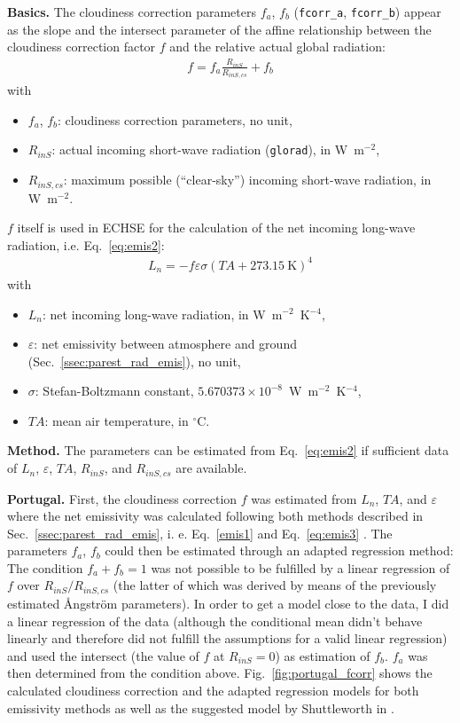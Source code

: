 \documentclass{scrreprt}
\newenvironment{denseitem}{
  \begin{itemize}
    \setlength{\itemsep}{0pt}
    \setlength{\parskip}{0pt}
    \setlength{\parsep}{0pt}
}{
  \end{itemize}
}
\begin{document}
\textbf{Basics.}
The cloudiness correction parameters $f_a$, $f_b$ (\verb!fcorr_a!, \verb!fcorr_b!) appear as the slope and the intersect parameter of the affine relationship between the cloudiness correction factor $f$ and the relative actual global radiation:
\begin{align} \label{eq:fcorr1}
  f = f_a \frac{R_{inS}}{R_{inS,cs}} + f_b
\end{align}
%
with
\begin{denseitem}
  \item[] $f_a$, $f_b$: cloudiness correction parameters, no unit,
  \item[] $R_{inS}$: actual incoming short-wave radiation (\verb!glorad!), in W~m$^{-2}$,
  \item[] $R_{inS,cs}$: maximum possible (``clear-sky'') incoming short-wave radiation, in W~m$^{-2}$.
\end{denseitem}
%
$f$ itself is used in ECHSE for the calculation of the net incoming long-wave radiation, i.e. Eq.~\eqref{eq:emis2}:
\begin{align*}
  L_n = -f \varepsilon \sigma (TA + 273.15~\text{K})^4
\end{align*}
%
with
\begin{denseitem}
  \item[] $L_n$: net incoming long-wave radiation, in W~m$^{-2}$~K$^{-4}$,
  \item[] $\varepsilon$: net emissivity between atmosphere and ground (Sec.~\ref{ssec:parest_rad_emis}), no unit,
  \item[] $\sigma$: Stefan-Boltzmann constant, $5.670373 \times 10^{-8}$~W~m$^{-2}$~K$^{-4}$,
  \item[] $TA$: mean air temperature, in $^\circ$C.
\end{denseitem}

\textbf{Method.}
The parameters can be estimated from Eq.~\eqref{eq:emis2} if sufficient data of $L_n$, $\varepsilon$, $TA$, $R_{inS}$, and $R_{inS,cs}$ are available.

\textbf{Portugal.}
First, the cloudiness correction $f$ was estimated from $L_n$, $TA$, and $\varepsilon$ where the net emissivity was calculated following both methods described in Sec.~\ref{ssec:parest_rad_emis}, i. e. Eq.~\eqref{emis1} \citep{brunt32} and Eq.~\eqref{eq:emis3} \citep{idso69}.
The parameters $f_a$, $f_b$ could then be estimated through an adapted regression method:
The condition $f_a + f_b = 1$ was not possible to be fulfilled by a linear regression of $f$ over $R_{inS}/R_{inS,cs}$ (the latter of which was derived by means of the previously estimated {\AA}ngstr\"om parameters).
In order to get a model close to the data, I did a linear regression of the data (although the conditional mean didn't behave linearly and therefore did not fulfill the assumptions for a valid linear regression) and used the intersect (the value of $f$ at $R_{inS} = 0$) as estimation of $f_b$.
$f_a$ was then determined from the condition above.
Fig.~\ref{fig:portugal_fcorr} shows the calculated cloudiness correction and the adapted regression models for both emissivity methods as well as the suggested model by Shuttleworth in \citet{maidment93}.
\end{document}
